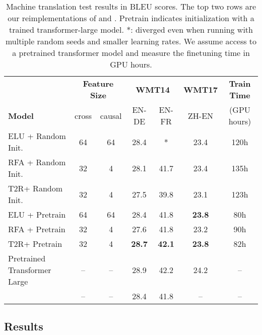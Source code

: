 \documentclass[11pt]{article}
\newcommand{\TRNN}{T2R\xspace}
\begin{document}
\begin{table*}[h]
\centering
\addtolength{\tabcolsep}{-0.0pt}  
\begin{tabular}{@{} lcccccc @{}}
\toprule
&  \multicolumn{2}{c}{\textbf{Feature Size }} &  
\multicolumn{2}{c}{\textbf{WMT14}} &  \textbf{WMT17} & \textbf{Train Time}\\ 
\cmidrule(lr){2-3} \cmidrule(lr){4-5}  \cmidrule(lr){6-6}
\textbf{Model} & cross & causal  & EN-DE & EN-FR & ZH-EN & (GPU hours)\\
 \hline
ELU + Random Init.\ & 64 & 64 & 28.4 & * & 23.4 & 120h \\
RFA + Random Init.\ & 32 & 4 & 28.1 & 41.7& 23.4 &135h\\
\TRNN + Random Init.\ &32 &  4 & 27.5 & 39.8 & 23.1 & 123h\\

\hdashline
ELU + Pretrain & 64 & 64 & 28.4&41.8 & \textbf{23.8} & 80h\\
RFA + Pretrain & 32 & 4 & 27.6 & 41.8 &23.2 & 90h \\
\TRNN + Pretrain & 32 & 4& \textbf{28.7} &\textbf{42.1} & \textbf{23.8} & 82h\\
\hline
Pretrained Transformer Large & -- & --& 28.9 & 42.2 & 24.2  & --\\
\citet{Vaswani2017AttentionIA} & -- &-- &  28.4 & 41.8 & -- & -- \\
\bottomrule
\end{tabular}
\caption{Machine translation test results in BLEU scores. The top two rows are our reimplementations of \citet{katharopoulos-et-al-2020} and \citet{RFA}. Pretrain indicates initialization with a trained transformer-large model.
*: diverged even when running with multiple random seeds and smaller learning rates. We assume access to a pretrained transformer model and measure the finetuning time in GPU hours.}
\label{mt_results}
\end{table*}
\subsection{Results}
\label{sec:results}
\end{document}
